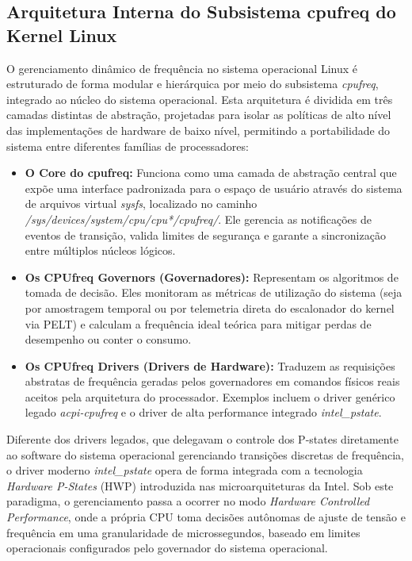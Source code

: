 \documentclass[12pt]{article}
\begin{document}
\subsection{Arquitetura Interna do Subsistema cpufreq do Kernel Linux}

O gerenciamento dinâmico de frequência no sistema operacional Linux é estruturado de forma modular e hierárquica por meio do subsistema \textit{cpufreq}, integrado ao núcleo do sistema operacional. Esta arquitetura é dividida em três camadas distintas de abstração, projetadas para isolar as políticas de alto nível das implementações de hardware de baixo nível, permitindo a portabilidade do sistema entre diferentes famílias de processadores:

\begin{itemize}
\item \textbf{O Core do cpufreq:} Funciona como uma camada de abstração central que expõe uma interface padronizada para o espaço de usuário através do sistema de arquivos virtual \textit{sysfs}, localizado no caminho \textit{/sys/devices/system/cpu/cpu*/cpufreq/}. Ele gerencia as notificações de eventos de transição, valida limites de segurança e garante a sincronização entre múltiplos núcleos lógicos.
\item \textbf{Os CPUfreq Governors (Governadores):} Representam os algoritmos de tomada de decisão. Eles monitoram as métricas de utilização do sistema (seja por amostragem temporal ou por telemetria direta do escalonador do kernel via PELT) e calculam a frequência ideal teórica para mitigar perdas de desempenho ou conter o consumo.
\item \textbf{Os CPUfreq Drivers (Drivers de Hardware):} Traduzem as requisições abstratas de frequência geradas pelos governadores em comandos físicos reais aceitos pela arquitetura do processador. Exemplos incluem o driver genérico legado \textit{acpi-cpufreq} e o driver de alta performance integrado \textit{intel\_pstate}.
\end{itemize}

Diferente dos drivers legados, que delegavam o controle dos P-states diretamente ao software do sistema operacional gerenciando transições discretas de frequência, o driver moderno \textit{intel\_pstate} opera de forma integrada com a tecnologia \textit{Hardware P-States} (HWP) introduzida nas microarquiteturas da Intel. Sob este paradigma, o gerenciamento passa a ocorrer no modo \textit{Hardware Controlled Performance}, onde a própria CPU toma decisões autônomas de ajuste de tensão e frequência em uma granularidade de microssegundos, baseado em limites operacionais configurados pelo governador do sistema operacional. 
\end{document}
